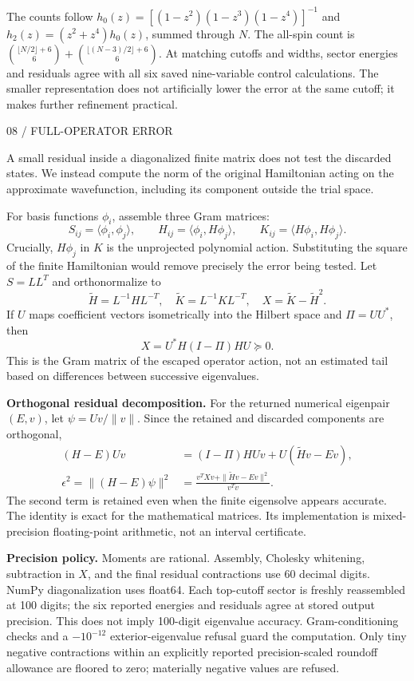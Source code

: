 \documentclass[11pt,letterpaper]{article}
\theoremstyle{plain}
\theoremstyle{definition}
\newcommand{\eyebrow}[1]{{\sffamily\small\color{teal}#1}\par}
\newcommand{\pagetitle}[2]{\eyebrow{#1}\vspace{3pt}{\LARGE #2}\par\vspace{5pt}}
\begin{document}
The counts follow $h_0(z)=[(1-z^2)(1-z^3)(1-z^4)]^{-1}$ and
$h_2(z)=(z^2+z^4)h_0(z)$, summed through $N$. The all-spin count is
$\binom{\lfloor N/2\rfloor+6}{6}+\binom{\lfloor(N-3)/2\rfloor+6}{6}$.
At matching cutoffs and widths, sector energies and residuals agree with all
six saved nine-variable control calculations. The smaller representation does
not artificially lower the error at the same cutoff; it makes further refinement practical.

\newpage
\pagetitle{08 / FULL-OPERATOR ERROR}{Measure the part the finite matrix cannot see}
A small residual inside a diagonalized finite matrix does not test the discarded
states. We instead compute the norm of the original Hamiltonian acting on the
approximate wavefunction, including its component outside the trial space.

For basis functions $\phi_i$, assemble three Gram matrices:
\[
 S_{ij}=\langle\phi_i,\phi_j\rangle,\qquad
 H_{ij}=\langle\phi_i,H\phi_j\rangle,\qquad
 K_{ij}=\langle H\phi_i,H\phi_j\rangle.
\]
Crucially, $H\phi_j$ in $K$ is the unprojected polynomial action. Substituting
the square of the finite Hamiltonian would remove precisely the error being tested.
Let $S=LL^T$ and orthonormalize to
\[
 \widetilde H=L^{-1}HL^{-T},\quad
 \widetilde K=L^{-1}KL^{-T},\quad
 X=\widetilde K-\widetilde H^2.
\]
If $U$ maps coefficient vectors isometrically into the Hilbert space and
$\Pi=UU^*$, then
\[
 X=U^*H(I-\Pi)HU\succeq0.
\]
This is the Gram matrix of the escaped operator action, not an estimated
tail based on differences between successive eigenvalues.

\textbf{Orthogonal residual decomposition.}
For the returned numerical eigenpair $(E,v)$, let $\psi=Uv/\|v\|$. Since
the retained and discarded components are orthogonal,
\begin{align*}
 (H-E)Uv&=(I-\Pi)HUv+U(\widetilde H v-Ev),\\
 \epsilon^2=\|(H-E)\psi\|^2
 &=\frac{v^TXv+\|\widetilde H v-Ev\|^2}{v^Tv}.
\end{align*}
The second term is retained even when the finite eigensolve appears accurate.
The identity is exact for the mathematical matrices. Its implementation is
mixed-precision floating-point arithmetic, not an interval certificate.

\textbf{Precision policy.}
Moments are rational. Assembly, Cholesky whitening, subtraction in $X$, and the
final residual contractions use 60 decimal digits. NumPy diagonalization uses
float64. Each top-cutoff sector is freshly reassembled at 100 digits; the six
reported energies and residuals agree at stored output precision. This does
not imply 100-digit eigenvalue accuracy. Gram-conditioning checks and a
$-10^{-12}$ exterior-eigenvalue refusal guard the computation. Only tiny negative
contractions within an explicitly reported precision-scaled roundoff allowance
are floored to zero; materially negative values are refused.
\end{document}
